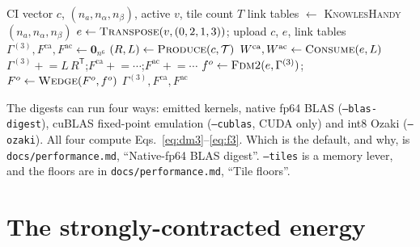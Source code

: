\documentclass[11pt]{article}
\newcommand{\code}[1]{\texttt{#1}}
\newcommand{\G}[1]{\Gamma^{(#1)}}
\newcommand{\Fca}{F^{\mathrm{ca}}}
\newcommand{\Fac}{F^{\mathrm{ac}}}
\begin{document}
\begin{algorithm}[htbp]
\caption{\code{buildRdmsDevice} (the default emitted digest; the GEMM digests
differ only in where the per-tile add happens)}
\label{alg:rdm}
\begin{algorithmic}[1]
\Require CI vector $c$, $(n_a, n_\alpha, n_\beta)$, active $v$, tile count $T$
\State link tables $\gets$ \textsc{KnowlesHandy}$(n_a, n_\alpha, n_\beta)$ 
\State $e \gets \textsc{Transpose}(v, (0,2,1,3))$; upload $c$, $e$, link tables
\State $\G3, \Fca, \Fac \gets \mathbf 0_{n^6}$ 
  \State $(R, L) \gets \textsc{Produce}(c, \mathcal T)$ 
  \State $W^{\mathrm{ca}}, W^{\mathrm{ac}} \gets \textsc{Consume}(e, L)$ 
  \State $\G3 \mathrel{+}= L\,R^{\mathsf T}$;\quad $\Fca \mathrel{+}= \cdots$;\quad $\Fac \mathrel{+}= \cdots$ 
\EndFor
{}
  \State $f^o \gets \textsc{Fdm2}(e, \G3)$;\quad $F^o \gets \textsc{Wedge}(F^o, f^o)$ 
\EndFor
\State \Return $\G3, \Fca, \Fac$ 
\end{algorithmic}
\end{algorithm}

The digests can run four ways: emitted kernels, native fp64 BLAS
(\code{--blas-digest}), cuBLAS fixed-point emulation (\code{--cublas}, CUDA
only) and int8 Ozaki (\code{--ozaki}). All four compute
Eqs.~\eqref{eq:dm3}--\eqref{eq:f3}. Which is the default, and why, is
\code{docs/performance.md}, ``Native-fp64 BLAS digest''. \code{--tiles} is a
memory lever, and the floors are in \code{docs/performance.md}, ``Tile
floors''.

\section{The strongly-contracted energy}
\label{sec:sc}
\end{document}
